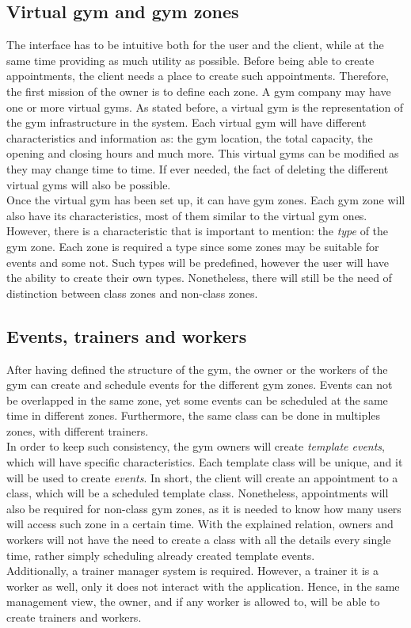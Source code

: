 \documentclass[a4paper, 12pt, oneside]{book}
\begin{document}
\subsection{Virtual gym and gym zones}
The interface has to be intuitive both for the user and the client, while at the same time providing as much utility as possible. Before being able to create appointments, the client needs a place to create such appointments. Therefore, the first mission of the owner is to define each zone. A gym company may have one or more virtual gyms. As stated before, a virtual gym is the representation of the gym infrastructure in the system. Each virtual gym will have different characteristics and information as: the gym location, the total capacity, the opening and closing hours and much more. This virtual gyms can be modified as they may change time to time. If ever needed, the fact of deleting the different virtual gyms will also be possible.
\\[8pt]
Once the virtual gym has been set up, it can have gym zones. Each gym zone will also have its characteristics, most of them similar to the virtual gym ones. However, there is a characteristic that is important to mention: the \emph{type} of the gym zone. Each zone is required a type since some zones may be suitable for events and some not. Such types will be predefined, however the user will have the ability to create their own types. Nonetheless, there will still be the need of distinction between class zones and non-class zones.
\subsection{Events, trainers and workers}
After having defined the structure of the gym, the owner or the workers of the gym can create and schedule events for the different gym zones. Events can not be overlapped in the same zone, yet some events can be scheduled at the same time in different zones. Furthermore, the same class can be done in multiples zones, with different trainers.
\\[8pt]
In order to keep such consistency, the gym owners will create \emph{template events}, which will have specific characteristics. Each template class will be unique, and it will be used to create \emph{events}. In short, the client will create an appointment to a class, which will be a scheduled template class. Nonetheless, appointments will also be required for non-class gym zones, as it is needed to know how many users will access such zone in a certain time. With the explained relation, owners and workers will not have the need to create a class with all the details every single time, rather simply scheduling already created template events.
\\[8pt]
Additionally, a trainer manager system is required. However, a trainer it is a worker as well, only it does not interact with the application. Hence, in the same management view, the owner, and if any worker is allowed to, will be able to create trainers and workers.
\end{document}
